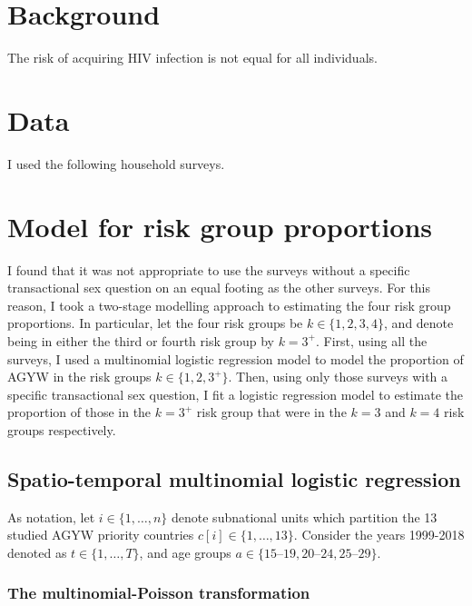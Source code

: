 \documentclass[a4paper, nobind]{templates/ociamthesis}
\begin{document}
\hypertarget{background-2}{%
\section{Background}\label{background-2}}

The risk of acquiring HIV infection is not equal for all individuals.

\hypertarget{data}{%
\section{Data}\label{data}}

I used the following household surveys.

\hypertarget{model-for-risk-group-proportions}{%
\section{Model for risk group proportions}\label{model-for-risk-group-proportions}}

I found that it was not appropriate to use the surveys without a specific transactional sex question on an equal footing as the other surveys.
For this reason, I took a two-stage modelling approach to estimating the four risk group proportions.
In particular, let the four risk groups be \(k \in \{1, 2, 3, 4\}\), and denote being in either the third or fourth risk group by \(k = 3^{+}\).
First, using all the surveys, I used a multinomial logistic regression model to model the proportion of AGYW in the risk groups \(k \in \{1, 2, 3^{+}\}\).
Then, using only those surveys with a specific transactional sex question, I fit a logistic regression model to estimate the proportion of those in the \(k = 3^{+}\) risk group that were in the \(k = 3\) and \(k = 4\) risk groups respectively.

\hypertarget{spatio-temporal-multinomial-logistic-regression}{%
\subsection{Spatio-temporal multinomial logistic regression}\label{spatio-temporal-multinomial-logistic-regression}}

As notation, let \(i \in \{1, \ldots, n\}\) denote subnational units which partition the 13 studied AGYW priority countries \(c[i] \in \{1, \ldots, 13\}\).
Consider the years 1999-2018 denoted as \(t \in \{1, \ldots, T\}\), and age groups \(a \in \{\text{15--19}, \text{20--24}, \text{25--29}\}\).

\hypertarget{the-multinomial-poisson-transformation}{%
\subsubsection{The multinomial-Poisson transformation}\label{the-multinomial-poisson-transformation}}
\end{document}
